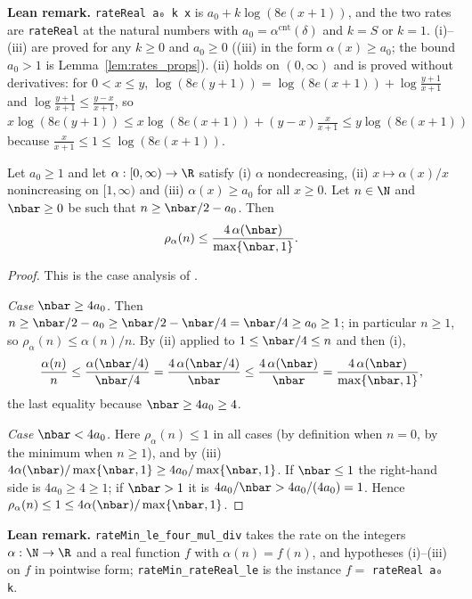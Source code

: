\textbf{Lean remark.} \texttt{rateReal a₀ k x} is $a_0 + k\log(8e(x+1))$, and the two rates are
\texttt{rateReal} at the natural numbers with $a_0 = \alpha^{\mathrm{cnt}}(\delta)$ and $k = S$ or $k = 1$.
(i)--(iii) are proved for any $k \ge 0$ and $a_0 \ge 0$ ((iii) in the form $\alpha(x) \ge a_0$; the bound
$a_0 > 1$ is Lemma~\ref{lem:rates_props}). (ii) holds on $(0, \infty)$ and is proved without derivatives:
for $0 < x \le y$, $\log(8e(y+1)) = \log(8e(x+1)) + \log\frac{y+1}{x+1}$ and
$\log\frac{y+1}{x+1} \le \frac{y-x}{x+1}$, so $x\log(8e(y+1)) \le x\log(8e(x+1)) + (y-x)\frac{x}{x+1}
\le y\log(8e(x+1))$ because $\frac{x}{x+1} \le 1 \le \log(8e(x+1))$.

\begin{lemma}\label{lem:sc_rate_min_arith}
\leanok
Let $a_0 \ge 1$ and let $\alpha : [0,\infty) \to \R$ satisfy
(i) $\alpha$ nondecreasing, (ii) $x \mapsto \alpha(x)/x$ nonincreasing on $[1,\infty)$ and
(iii) $\alpha(x) \ge a_0$ for all $x \ge 0$. Let $n \in \N$ and $\nbar \ge 0$ be such that
$n \ge \nbar/2 - a_0$. Then
\[
  \rho_\alpha(n) \le \frac{4\,\alpha(\nbar)}{\max\{\nbar, 1\}} .
\]
\end{lemma}

\begin{proof}
\leanok
{}
This is the case analysis of \cite[Lemma~7]{menard2021fast}.

\emph{Case $\nbar \ge 4a_0$.} Then $n \ge \nbar/2 - a_0 \ge \nbar/2 - \nbar/4 = \nbar/4 \ge a_0 \ge 1$;
in particular $n \ge 1$, so $\rho_\alpha(n) \le \alpha(n)/n$. By (ii) applied to
$1 \le \nbar/4 \le n$ and then (i),
\[
  \frac{\alpha(n)}{n} \le \frac{\alpha(\nbar/4)}{\nbar/4} = \frac{4\,\alpha(\nbar/4)}{\nbar} \le \frac{4\,\alpha(\nbar)}{\nbar}
  = \frac{4\,\alpha(\nbar)}{\max\{\nbar,1\}},
\]
the last equality because $\nbar \ge 4a_0 \ge 4$.

\emph{Case $\nbar < 4a_0$.} Here $\rho_\alpha(n) \le 1$ in all cases (by definition when $n = 0$,
by the minimum when $n \ge 1$), and by (iii) $4\alpha(\nbar)/\max\{\nbar,1\} \ge 4a_0/\max\{\nbar,1\}$.
If $\nbar \le 1$ the right-hand side is $4a_0 \ge 4 \ge 1$; if $\nbar > 1$ it is
$4a_0/\nbar > 4a_0/(4a_0) = 1$. Hence $\rho_\alpha(n) \le 1 \le 4\alpha(\nbar)/\max\{\nbar,1\}$.
\end{proof}

\textbf{Lean remark.} \texttt{rateMin\_le\_four\_mul\_div} takes the rate on the integers
$\alpha : \N \to \R$ and a real function $f$ with $\alpha(n) = f(n)$, and hypotheses (i)--(iii) on $f$ in
pointwise form; \texttt{rateMin\_rateReal\_le} is the instance $f = $ \texttt{rateReal a₀ k}.

